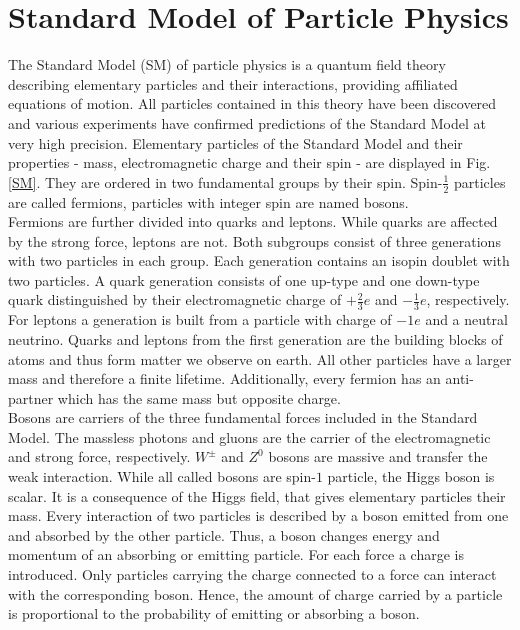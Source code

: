 \section{Standard Model of Particle Physics}
	The Standard Model (SM) of particle physics is a quantum field theory describing elementary particles and their interactions, providing affiliated equations of motion. All particles contained in this theory have been discovered and various experiments have confirmed predictions of the Standard Model at very high precision. Elementary particles of the Standard Model and their properties - mass, electromagnetic charge and their spin - are displayed in Fig. \ref{SM}. They are ordered in two fundamental groups by their spin. Spin-$\frac{1}{2}$ particles are called fermions, particles with integer spin are named bosons. 
	\\
	Fermions are further divided into quarks and leptons. While quarks are affected by the strong force, leptons are not. Both subgroups consist of three generations with two particles in each group. Each generation contains an isopin doublet with two particles. A quark generation consists of one up-type and one down-type quark distinguished by their electromagnetic charge of $+\frac{2}{3}e$ and $-\frac{1}{3}e$, respectively. For leptons a generation is built from a particle with charge of $-1e$ and a neutral neutrino. Quarks and leptons from the first generation are the building blocks of atoms and thus form matter we observe on earth. All other particles have a larger mass and therefore a finite lifetime. Additionally, every fermion has an anti-partner which has the same mass but opposite charge. 
	\\	
	Bosons are carriers of the three fundamental forces included in the Standard Model. The massless photons and gluons are the carrier of the electromagnetic and strong force, respectively. $W^\pm$ and $Z^0$ bosons are massive and transfer the weak interaction. While all called bosons are spin-$1$ particle, the Higgs boson is scalar. It is a consequence of the Higgs field, that gives elementary particles their mass. Every interaction of two particles is described by a boson emitted from one and absorbed by the other particle. Thus, a boson changes energy and momentum of an absorbing or emitting particle. For each force a charge is introduced. Only particles carrying the charge connected to a force can interact with the corresponding boson. Hence, the amount of charge carried by a particle is proportional to the probability of emitting or absorbing a boson. 
	\\
